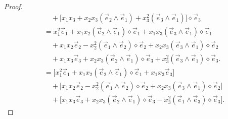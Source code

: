 \documentclass{amsart}
\theoremstyle{plain}
\numberwithin{equation}{section}
\begin{document}
\begin{proof}
\begin{align*}
&\quad + \Big[
x_{1}x_{3}
+ x_{2}x_{3}\left( \vec{e}_{2}\wedge \vec{e}_{1} \right)
+ x_{3}^{2}\left( \vec{e}_{3}\wedge \vec{e}_{1} \right)
\Big]\diamond \vec{e}_{3} \\[4pt]
&= x_{1}^{2}\vec{e}_{1}
+ x_{1}x_{2}\left( \vec{e}_{2}\wedge \vec{e}_{1} \right)\diamond \vec{e}_{1}
+ x_{1}x_{3}\left( \vec{e}_{3}\wedge \vec{e}_{1} \right)\diamond \vec{e}_{1} \\[6pt]
&\quad + x_{1}x_{2}\vec{e}_{2}
- x_{2}^{2}\left( \vec{e}_{1}\wedge \vec{e}_{2} \right)\diamond \vec{e}_{2}
+ x_{2}x_{3}\left( \vec{e}_{3}\wedge \vec{e}_{1} \right)\diamond \vec{e}_{2} \\[6pt]
&\quad + x_{1}x_{3}\vec{e}_{3}
+ x_{2}x_{3}\left( \vec{e}_{2}\wedge \vec{e}_{1} \right)\diamond \vec{e}_{3}
+ x_{3}^{2}\left( \vec{e}_{3}\wedge \vec{e}_{1} \right)\diamond \vec{e}_{3}. \\[4pt]
&= \Big[
x_{1}^{2}\vec{e}_{1}
+ x_{1}x_{2}\left( \vec{e}_{2}\wedge \vec{e}_{1} \right)\diamond \vec{e}_{1}
+ x_{1}x_{3}\vec{e}_{3}
\Big] \\[6pt]
&\quad + \Big[
x_{1}x_{2}\vec{e}_{2}
- x_{2}^{2}\left( \vec{e}_{1}\wedge \vec{e}_{2} \right)\diamond \vec{e}_{2}
+ x_{2}x_{3}\left( \vec{e}_{3}\wedge \vec{e}_{1} \right)\diamond \vec{e}_{2}
\Big] \\[6pt]
&\quad + \Big[
x_{1}x_{3}\vec{e}_{3}
+ x_{2}x_{3}\left( \vec{e}_{2}\wedge \vec{e}_{1} \right)\diamond \vec{e}_{3}
- x_{3}^{2}\left( \vec{e}_{1}\wedge \vec{e}_{3} \right)\diamond \vec{e}_{3}
\Big].
\end{align*}


\end{proof}
\end{document}
